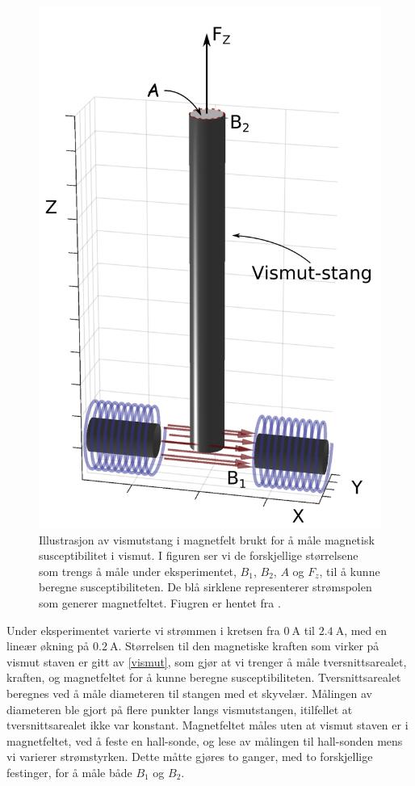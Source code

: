 \documentclass[%
 reprint,
 amsmath,amssymb,
 aps,
]{revtex4-1}
\begin{document}
\begin{figure}[h!]
  \centering
  \includegraphics[scale=0.38]{oppsett1.png}
  \caption{Illustrasjon av vismutstang i magnetfelt brukt for å måle magnetisk susceptibilitet i vismut. I figuren ser vi de forskjellige størrelsene som trengs å måle under eksperimentet, $B_1$, $B_2$, $A$ og $F_z$, til å kunne beregne susceptibiliteten. De blå sirklene representerer strømspolen som generer magnetfeltet. Fiugren er hentet fra \cite{oppgave}.}
  \label{eksperimentelt_oppsett1}
\end{figure}
Under eksperimentet varierte vi strømmen i kretsen fra $\SI{0}{\ampere}$ til $\SI{2.4}{\ampere}$, med en lineær økning på $\SI{0.2}{\ampere}$. Størrelsen til den magnetiske kraften som virker på vismut staven er gitt av \eqref{vismut}, som gjør at vi trenger å måle tversnittsarealet, kraften, og magnetfeltet for å kunne beregne susceptibiliteten. Tversnittsarealet beregnes ved å måle diameteren til stangen med et skyvelær. Målingen av diameteren ble gjort på flere punkter langs vismutstangen, itilfellet at tversnittsarealet ikke var konstant. Magnetfeltet måles uten at vismut staven er i magnetfeltet, ved å feste en hall-sonde, og lese av målingen til hall-sonden mens vi varierer strømstyrken. Dette måtte gjøres to ganger, med to forskjellige festinger, for å måle både $B_1$ og $B_2$. \\
\end{document}
